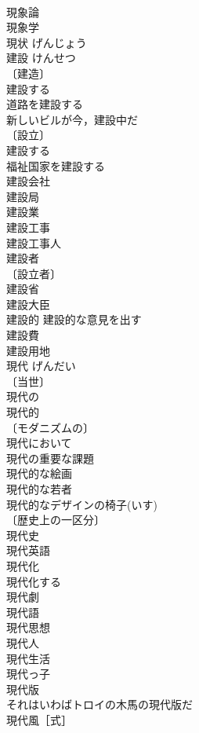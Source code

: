 \documentclass[8pt]{extreport}
\begin{document}
\begin{CJK}{UTF8}{min}
\\	現象論 
\\	現象学 
\\	現状	げんじょう	
\\	建設	けんせつ	
\\	〔建造〕
\\	建設する 
\\	道路を建設する 
\\	新しいビルが今，建設中だ 
\\	〔設立〕
\\	建設する 
\\	福祉国家を建設する 
\\	建設会社 
\\	建設局 
\\	建設業 
\\	建設工事 
\\	建設工事人 
\\	建設者 
\\	〔設立者〕
\\	建設省 
\\	建設大臣 
\\	建設的 建設的な意見を出す 
\\	建設費 
\\	建設用地 
\\	現代	げんだい	
\\	〔当世〕
\\	現代の 
\\	現代的 
\\	〔モダニズムの〕
\\	現代において 
\\	現代の重要な課題 
\\	現代的な絵画 
\\	現代的な若者 
\\	現代的なデザインの椅子(いす) 
\\	〔歴史上の一区分〕
\\	現代史 
\\	現代英語 
\\	現代化 
\\	現代化する 
\\	現代劇 
\\	現代語 
\\	現代思想 
\\	現代人 
\\	現代生活 
\\	現代っ子 
\\	現代版 
\\	それはいわばトロイの木馬の現代版だ 
\\	現代風［式］ 

\end{CJK}
\end{document}
